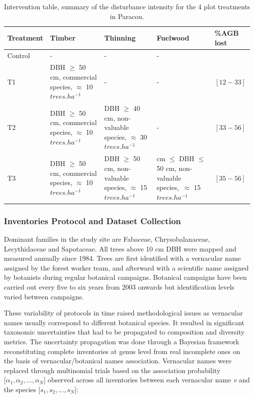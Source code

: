 \documentclass[
  11pt,
  french,
  A4paper,
  extrafontsizes,onecolumn,openright
  ]{memoir}
\begin{document}
\begingroup\fontsize{7}{9}\selectfont

\begin{longtable}[t]{>{\raggedright\arraybackslash}p{5em}|>{\raggedright\arraybackslash}p{8em}|>{\raggedright\arraybackslash}p{8em}|>{\raggedright\arraybackslash}p{11em}|>{\raggedright\arraybackslash}p{4em}}
\caption{\label{tab:Tab1bis}Intervention table, summary of the disturbance intensity for the 4 plot treatments in Paracou.}\\
\hline
Treatment & Timber & Thinning & Fuelwood & \%AGB lost\\
\hline
Control & - & - & - & 0\\
\hline
T1 & DBH $\geq$ 50 cm, commercial species, $\approx$ 10   $trees.ha^{-1}$ & - & - & $[12-33]$\\
\hline
T2 & DBH $\geq$ 50 cm, commercial species, $\approx$ 10  $trees.ha^{-1}$ & DBH $\geq$ 40 cm, non-valuable species, $\approx$ 30   $trees.ha^{-1}$ & - & $[33-56]$\\
\hline
T3 & DBH $\geq$ 50 cm, commercial species, $\approx$ 10  $trees.ha^{-1}$ & DBH $\geq$ 50 cm, non-valuable species, $\approx$ 15  $trees.ha^{-1}$ & 40 cm $\leq$ DBH $\leq$ 50 cm, non-valuable species,\ $\approx$ 15 $trees.ha^{-1}$ & $[35-56]$\\
\hline
\end{longtable}

\endgroup{}

\subsubsection{Inventories Protocol and Dataset
Collection}\label{inventories-protocol-and-dataset-collection-1}

Dominant families in the study site are Fabaceae, Chrysobalanaceae,
Lecythidaceae and Sapotaceae. All trees above 10 cm DBH were mapped and
measured annually since 1984. Trees are first identified with a
vernacular name assigned by the forest worker team, and afterward with a
scientific name assigned by botanists during regular botanical
campaigns. Botanical campaigns have been carried out every five to six
years from 2003 onwards but identification levels varied between
campaigns.

These variability of protocols in time raised methodological issues as
vernacular names usually correspond to different botanical species. It
resulted in significant taxonomic uncertainties that had to be
propagated to composition and diversity metrics. The uncertainty
propagation was done through a Bayesian framework reconstituting
complete inventories at genus level from real incomplete ones on the
basis of vernacular/botanical names association. Vernacular names were
replaced through multinomial trials based on the association probability
\(\big[\alpha_1, \alpha_2,..., \alpha_N\big]\) observed across all
inventories between each vernacular name \emph{v} and the species
\(\big[s_1, s_2,..., s_N\big]\):
\end{document}
